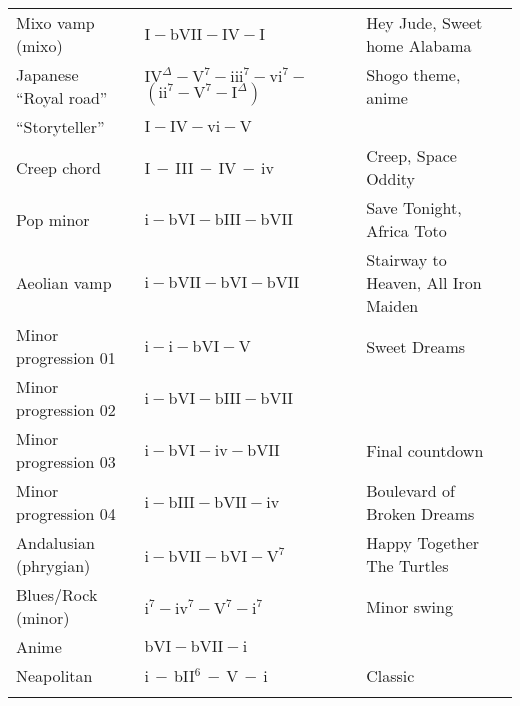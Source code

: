 \begin{table*}[!h]
\begin{adjustwidth}{-3cm}{}
\begin{tabular}{p{5.0cm}p{5.5cm}p{7cm}}
	    Mixo vamp (mixo)      & $\textrm{I}-\textrm{bVII}-\textrm{IV}-\textrm{I}$ & Hey Jude, Sweet home Alabama \\
	    Japanese ``Royal road'' & $\textrm{IV}^\Delta-\textrm{V}^7-\textrm{iii}^7-\textrm{vi}^7-$ {\footnotesize $(\textrm{ii}^7-\textrm{V}^7-\textrm{I}^{\Delta})$} & Shogo theme, anime \\
	    ``Storyteller''       & $\textrm{I}-\textrm{IV}-\textrm{vi}-\textrm{V}$ & \\
	    Creep chord            & I$\,-\,$III$\,-\,$IV$\,-\,$iv &  Creep, Space Oddity \\
		Pop minor             & $\textrm{i}-\textrm{bVI}-\textrm{bIII}-\textrm{bVII}$ & Save Tonight, Africa Toto \\
	    Aeolian vamp          & $\textrm{i}-\textrm{bVII}-\textrm{bVI}-\textrm{bVII}$  & Stairway to Heaven, All Iron Maiden \vspace{-0.8cm}  \\
		Minor progression 01    & $\textrm{i}-\textrm{i}-\textrm{bVI}-\textrm{V}$ & Sweet Dreams \\
	    Minor progression 02    & $\textrm{i}-\textrm{bVI}-\textrm{bIII}-\textrm{bVII}$ &  \\
	    Minor progression 03    & $\textrm{i}-\textrm{bVI}-\textrm{iv}-\textrm{bVII}$ & Final countdown\\
	    Minor progression 04    & $\textrm{i}-\textrm{bIII}-\textrm{bVII}-\textrm{iv}$ & Boulevard of Broken Dreams\\
	    Andalusian	(phrygian)& $\textrm{i}-\textrm{bVII}-\textrm{bVI}-\textrm{V}^7$ & Happy Together The Turtles\\
	    Blues/Rock (minor)      & $\textrm{i}^7-\textrm{iv}^7-\textrm{V}^7-\textrm{i}^7$ & Minor swing\\
	    Anime                   & $\textrm{bVI}-\textrm{bVII}-\textrm{i}$   &             \\
		Neapolitan              & i$\,-\,$bII$^6\,-\,$V$\,-\,$i &  Classic \\
		\hline \vspace{-0.2cm} \\
	\end{tabular}
	\end{adjustwidth}
	\label{tab:}
\end{table*}
